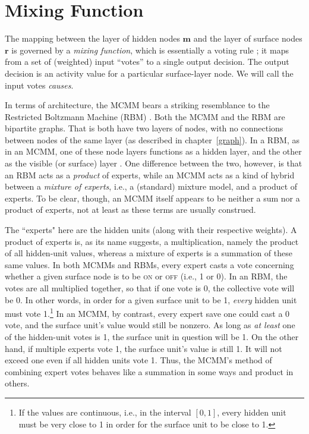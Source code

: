 \section{Mixing Function}
\label{sec:mixing-function}

The mapping between the layer of hidden nodes $\textbf{m}$ 
and the layer of surface nodes $\textbf{r}$ is governed by a 
\emph{mixing function}, which is essentially
a voting rule \citep{saund:94}; it maps from a set of (weighted)
input ``votes'' to a single output decision.  The output decision is 
an activity value for a particular surface-layer node. We will call the input votes
\emph{causes}. 

In terms of architecture, the \ac{MCMM} bears a striking resemblance to the Restricted Boltzmann Machine (RBM) \citep{smolensky:1986}.
Both the \ac{MCMM} and the \ac{RBM} are bipartite graphs. That is both have two layers of nodes, with no connections between nodes of the same layer (as described in chapter~\ref{graph}).  In a RBM, as in an \ac{MCMM}, one of these node layers functions as a hidden layer, and the other as the visible (or surface) layer \citep[see, e.g.,][]{mohamed-and-hinton:2010}. One difference between the two, however, is that an RBM acts as a \emph{product} of experts, while an \ac{MCMM} acts as a kind of hybrid between a \emph{mixture of experts}, i.e., a (standard) mixture model, and a product of experts. To be clear, though, an \ac{MCMM} itself appears to be neither a sum nor a product of experts, not at least as these terms are usually construed. 

The ``experts" here 
are the hidden units (along with their
respective weights). A product of experts is, as its name suggests, a multiplication, namely the product of all hidden-unit values, whereas a mixture of experts is a summation of these same values. In both MCMMs and RBMs, every expert casts a vote concerning whether a given surface node is to be \textsc{on} or \textsc{off} (i.e., 1 or 0). In an RBM, the votes are all multiplied together, so that if one vote is 0, the collective vote will be 0. In other words, in order for a given surface unit to be 1, \emph{every} hidden unit must vote 1.\footnote{If the values are continuous, i.e., in the interval $[0,1]$, every hidden unit must be very close to 1 in order for the surface unit to be close to 1.}
In an MCMM, by contrast, every expert save one could cast a 0 vote, and the surface unit's value would still be nonzero. As long as \emph{at least} one of the hidden-unit votes is 1, the surface unit in question will be 1. On the other hand, if multiple experts vote 1, the surface unit's value is still 1. It will not exceed one even if all hidden units vote 1. Thus, the \ac{MCMM}'s method of combining expert votes behaves like a summation in some ways and product in others.  

